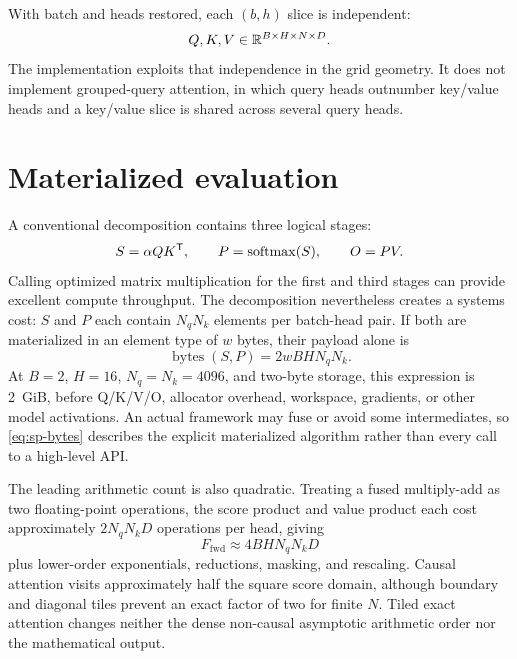With batch and heads restored, each $(b,h)$ slice is independent:
\begin{equation}
  Q,K,V\in\mathbb{R}^{B\times H\times N\times D}.
\end{equation}
The implementation exploits that independence in the grid geometry. It does not implement grouped-query attention, in which query heads outnumber key/value heads and a key/value slice is shared across several query heads.

\section{Materialized evaluation}

A conventional decomposition contains three logical stages:
\begin{equation}
  S=\alpha QK^{\mathsf T},\qquad P=\operatorname{softmax}(S),\qquad O=PV.
  \label{eq:three-stages}
\end{equation}
Calling optimized matrix multiplication for the first and third stages can provide excellent compute throughput. The decomposition nevertheless creates a systems cost: $S$ and $P$ each contain $N_qN_k$ elements per batch-head pair. If both are materialized in an element type of $w$ bytes, their payload alone is
\begin{equation}
  \operatorname{bytes}(S,P)=2wBHN_qN_k.
  \label{eq:sp-bytes}
\end{equation}
At $B=2$, $H=16$, $N_q=N_k=4096$, and two-byte storage, this expression is 2~GiB, before Q/K/V/O, allocator overhead, workspace, gradients, or other model activations. An actual framework may fuse or avoid some intermediates, so \eqref{eq:sp-bytes} describes the explicit materialized algorithm rather than every call to a high-level API.

The leading arithmetic count is also quadratic. Treating a fused multiply-add as two floating-point operations, the score product and value product each cost approximately $2N_qN_kD$ operations per head, giving
\begin{equation}
  F_{\mathrm{fwd}}\approx 4BHN_qN_kD
  \label{eq:forward-flops}
\end{equation}
plus lower-order exponentials, reductions, masking, and rescaling. Causal attention visits approximately half the square score domain, although boundary and diagonal tiles prevent an exact factor of two for finite $N$. Tiled exact attention changes neither the dense non-causal asymptotic arithmetic order nor the mathematical output.

